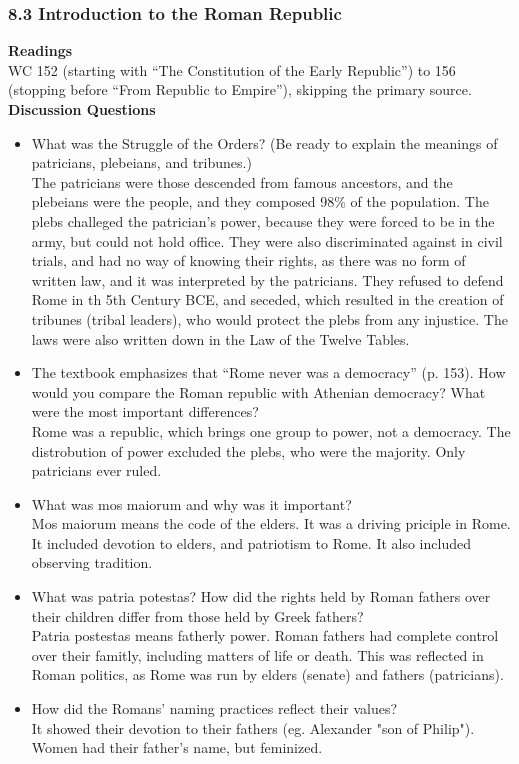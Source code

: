 \documentclass{article}
\begin{document}
\subsubsection*{8.3 Introduction to the Roman Republic}
\textbf{Readings} \\
WC 152 (starting with “The Constitution of the Early Republic”) to 156 (stopping before
“From Republic to Empire”), skipping the primary source. \\
\textbf{Discussion Questions}
\begin{itemize}
  \item What was the Struggle of the Orders? (Be ready to explain the meanings of
  patricians,  plebeians, and tribunes.) \\
  The patricians were those descended from famous ancestors, and the plebeians were
   the people, and they composed 98\% of the population. The plebs challeged the
   patrician's power, because they were forced to be in the army, but could not hold office.
   They were also discriminated against in civil trials, and had no way of knowing their
   rights, as there was no form of written law, and it was interpreted by the patricians.
   They refused to defend Rome in th 5th Century BCE, and seceded, which resulted in the
   creation of tribunes (tribal leaders), who would protect the plebs from any injustice.
   The laws were also written down in the Law of the Twelve Tables.
  \item The textbook emphasizes that “Rome never was a democracy” (p. 153).  How
  would you compare the Roman republic with Athenian democracy? What were the most
  important differences? \\
  Rome was a republic, which brings one group to power, not a democracy. The distrobution
  of power excluded the plebs, who were the majority. Only patricians ever ruled.
  \item What was mos maiorum and why was it important? \\
  Mos maiorum means the code of the elders. It was a driving priciple in Rome. It included
  devotion to elders, and patriotism to Rome. It also included observing tradition.
  \item What was patria potestas? How did the rights held by Roman fathers over their
  children differ from those held by Greek fathers? \\
  Patria postestas means fatherly power. Roman fathers had complete control over their
  famitly, including matters of life or death. This was reflected in Roman politics, as Rome
  was run by elders (senate) and fathers (patricians).
  \item How did the Romans’ naming practices reflect their values? \\
  It showed their devotion to their fathers (eg. Alexander "son of Philip"). Women had their
  father's name, but feminized.
\end{itemize}
\end{document}
